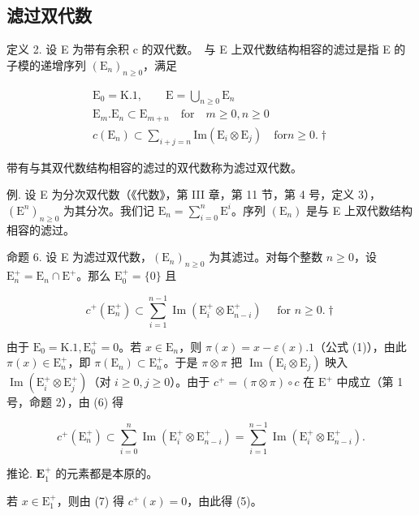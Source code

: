 \subsection{滤过双代数}

定义 2. 设 E 为带有余积 c 的双代数。~与 E 上双代数结构相容的滤过是指 E 的子模的递增序列 \((\mathrm{E}_{n})_{n\geq0}\)，满足

\[
\begin{array}{c} \mathrm{E} _ {0} = \mathrm{K}. 1, \qquad \mathrm{E} = \bigcup_ {n \geqslant 0} \mathrm{E} _ {n} \\ \mathrm{E} _ {m}. \mathrm{E} _ {n} \subset \mathrm{E} _ {m + n} \quad \text {for} \quad m \geqslant 0, n \geqslant 0 \\ c (\mathrm{E} _ {n}) \subset \sum_ {i + j = n} \mathrm{Im} (\mathrm{E} _ {i} \otimes \mathrm{E} _ {j}) \quad \text {for} n \geqslant 0. \dagger \end{array}\tag{6}
\]

带有与其双代数结构相容的滤过的双代数称为滤过双代数。

例. 设 E 为分次双代数（《代数》，第 III 章，第 11 节，第 4 号，定义 3），\((\mathrm{E}^n)_{n\geqslant 0}\) 为其分次。我们记 \(\mathrm{E}_n = \sum_{i = 0}^{n}\mathrm{E}^i\)。序列 \((\mathrm{E}_n)\) 是与 E 上双代数结构相容的滤过。

命题 6. 设 E 为滤过双代数，\((\mathrm{E}_n)_{n\geqslant 0}\) 为其滤过。对每个整数 \(n\geqslant 0\)，设 \(\mathrm{E}_n^+ = \mathrm{E}_n\cap \mathrm{E}^+\)。那么 \(\mathrm{E_0^+} = \{0\}\) 且

\[
c ^ {+} (\mathrm{E} _ {n} ^ {+}) \subset \sum_ {i = 1} ^ {n - 1} \operatorname{Im} (\mathrm{E} _ {i} ^ {+} \otimes \mathrm{E} _ {n - i} ^ {+}) \quad \text { for } n \geqslant 0. \dagger\tag{7}
\]

由于 \(\mathrm{E}_0 = \mathrm{K}.1, \mathrm{E}_0^+ = 0\)。若 \(x \in \mathrm{E}_n\)，则 \(\pi(x) = x - \varepsilon(x).1\)（公式 (1)），由此 \(\pi(x) \in \mathrm{E}_n^+\)，即 \(\pi(\mathrm{E}_n) \subset \mathrm{E}_n^+\)。于是 \(\pi \otimes \pi\) 把 \(\operatorname{Im}(\mathrm{E}_i \otimes \mathrm{E}_j)\) 映入 \(\operatorname{Im}(\mathrm{E}_i^+ \otimes \mathrm{E}_j^+)\)（对 \(i \geqslant 0, j \geqslant 0\)）。由于 \(c^+ = (\pi \otimes \pi) \circ c\) 在 \(\mathrm{E}^+\) 中成立（第 1 号，命题 2），由 (6) 得

\[
c ^ {+} \left(\mathrm{E} _ {n} ^ {+}\right) \subset \sum_ {i = 0} ^ {n} \operatorname{Im} \left(\mathrm{E} _ {i} ^ {+} \otimes \mathrm{E} _ {n - i} ^ {+}\right) = \sum_ {i = 1} ^ {n - 1} \operatorname{Im} \left(\mathrm{E} _ {i} ^ {+} \otimes \mathrm{E} _ {n - i} ^ {+}\right).
\]

推论. \(\mathbf{E}_1^+\) 的元素都是本原的。

若 \(x \in \mathrm{E}_{1}^{+}\)，则由 (7) 得 \(c^{+}(x) = 0\)，由此得 (5)。

